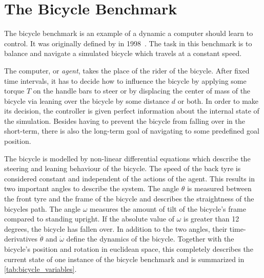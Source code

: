 \chapter{The Bicycle Benchmark}
\label{cha:the_bicycle_benchmark}
The bicycle benchmark is an example of a dynamic a computer should learn to control.
It was originally defined by \citeauthor{randlov_learning_1998} in 1998~\cite{randlov_learning_1998}.
The task in this benchmark is to balance and navigate a simulated bicycle which travels at a constant speed.

The computer, or \emph{agent}, takes the place of the rider of the bicycle.
After fixed time intervals, it has to decide how to influence the bicycle by applying some torque $T$ on the handle bars to steer or by displacing the center of mass of the bicycle via leaning over the bicycle by some distance $d$ or both.
In order to make its decision, the controller is given perfect information about the internal state of the simulation.
Besides having to prevent the bicycle from falling over in the short-term, there is also the long-term goal of navigating to some predefined goal position.

The bicycle is modelled by non-linear differential equations which describe the steering and leaning behaviour of the bicycle.
The speed of the back tyre is considered constant and independent of the actions of the agent.
This results in two important angles to describe the system.
The angle $\theta$ is measured between the front tyre and the frame of the bicycle and describes the straightness of the bicycles path.
The angle $\omega$ measures the amount of tilt of the bicycle's frame compared to standing upright.
If the absolute value of $\omega$ is greater than 12 degrees, the bicycle has fallen over.
In addition to the two angles, their time-derivatives $\dot{\theta}$ and $\dot{\omega}$ define the dynamics of the bicycle.
Together with the bicycle's position and rotation in euclidean space, this completely describes the current state of one instance of the bicycle benchmark and is summarized in \cref{tab:bicycle_variables}.


